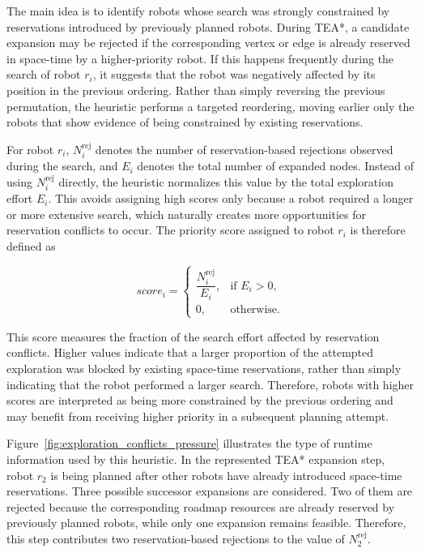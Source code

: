 The main idea is to identify robots whose search was strongly constrained by reservations introduced by previously planned robots. During TEA*, a candidate expansion may be rejected if the corresponding vertex or edge is already reserved in space-time by a higher-priority robot. If this happens frequently during the search of robot $r_i$, it suggests that the robot was negatively affected by its position in the previous ordering. Rather than simply reversing the previous permutation, the heuristic performs a targeted reordering, moving earlier only the robots that show evidence of being constrained by existing reservations.

For robot \(r_i\), \(N_i^{\mathrm{rej}}\) denotes the number of reservation-based rejections observed during the search, and \(E_i\) denotes the total number of expanded nodes. Instead of using \(N_i^{\mathrm{rej}}\) directly, the heuristic normalizes this value by the total exploration effort \(E_i\). This avoids assigning high scores only because a robot required a longer or more extensive search, which naturally creates more opportunities for reservation conflicts to occur. The priority score assigned to robot \(r_i\) is therefore defined as

\begin{equation}
    score_i
    =
    \begin{cases}
    \dfrac{N_i^{\mathrm{rej}}}{E_i}, & \text{if } E_i > 0, \\
    0, & \text{otherwise}.
    \end{cases}
    \label{eq:exploration_conflicts_pressure_score}
\end{equation}

This score measures the fraction of the search effort affected by reservation conflicts. Higher values indicate that a larger proportion of the attempted exploration was blocked by existing space-time reservations, rather than simply indicating that the robot performed a larger search. Therefore, robots with higher scores are interpreted as being more constrained by the previous ordering and may benefit from receiving higher priority in a subsequent planning attempt.

Figure~\ref{fig:exploration_conflicts_pressure} illustrates the type of runtime information used by this heuristic. In the represented TEA* expansion step, robot $r_2$ is being planned after other robots have already introduced space-time reservations. Three possible successor expansions are considered. Two of them are rejected because the corresponding roadmap resources are already reserved by previously planned robots, while only one expansion remains feasible. Therefore, this step contributes two reservation-based rejections to the value of $N_2^{\mathrm{rej}}$.

